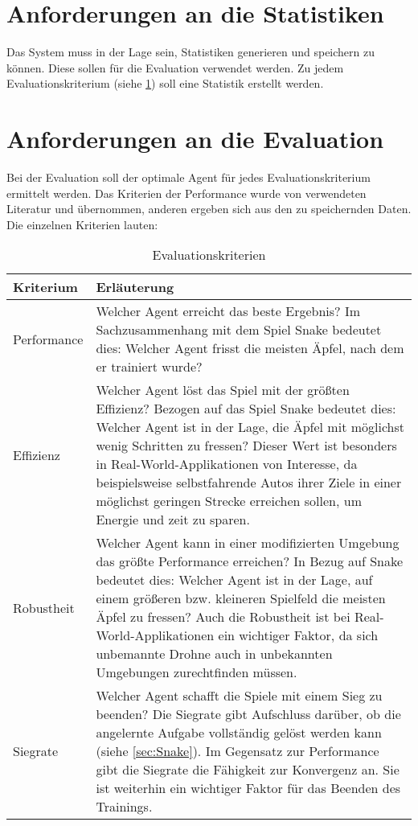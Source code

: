 \section{Anforderungen an die Statistiken} \label{sec:Anforderungen_Statistik}
Das System muss in der Lage sein, Statistiken generieren und speichern zu können. Diese sollen für die Evaluation verwendet werden. Zu jedem Evaluationskriterium (siehe \ref{tab:Kriterien}) soll eine Statistik erstellt werden. 

\section{Anforderungen an die Evaluation} \label{sec:Anforderungen_an_die_Evaluation}
Bei der Evaluation soll der optimale Agent für jedes Evaluationskriterium ermittelt werden.
Das Kriterien der Performance wurde von verwendeten Literatur \cite{Autonomous_Agents_in_Snake_Game_via_DRL} und \cite{UAV} übernommen, anderen ergeben sich aus den zu speichernden Daten.
Die einzelnen Kriterien lauten:
\begin{longtable}[h]{|p{4cm}|p{\linewidth - 5cm}|}
	\caption{Evaluationskriterien}
	\label{tab:Kriterien} 
	\endfirsthead
	\endhead
	\hline
	Kriterium & Erläuterung \\
	\hline
	Performance & Welcher Agent erreicht das beste Ergebnis? Im Sachzusammenhang mit dem Spiel Snake bedeutet dies: Welcher Agent frisst die meisten Äpfel, nach dem er trainiert wurde?\\
	\hline
	Effizienz & Welcher Agent löst das Spiel mit der größten Effizienz? Bezogen auf das Spiel Snake bedeutet dies: Welcher Agent ist in der Lage, die Äpfel mit möglichst wenig Schritten zu fressen? Dieser Wert ist besonders in Real-World-Applikationen von Interesse, da beispielsweise selbstfahrende Autos ihrer Ziele in einer möglichst geringen Strecke erreichen sollen, um Energie und zeit zu sparen.\\
	\hline
	Robustheit & Welcher Agent kann in einer modifizierten Umgebung das größte Performance erreichen? In Bezug auf Snake bedeutet dies: Welcher Agent ist in der Lage, auf einem größeren bzw. kleineren Spielfeld die meisten Äpfel zu fressen? Auch die Robustheit ist bei Real-World-Applikationen ein wichtiger Faktor, da sich unbemannte Drohne auch in unbekannten Umgebungen zurechtfinden müssen.\\
	\hline
	Siegrate & Welcher Agent schafft die Spiele mit einem Sieg zu beenden? Die Siegrate gibt Aufschluss darüber, ob die angelernte Aufgabe vollständig gelöst werden kann (siehe \ref{sec:Snake}). Im Gegensatz zur Performance gibt die Siegrate die Fähigkeit zur Konvergenz an.
	Sie ist weiterhin ein wichtiger Faktor für das Beenden des Trainings.\\
	\hline
\end{longtable}